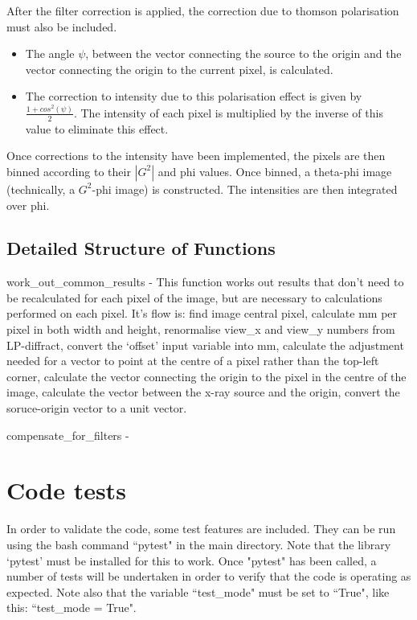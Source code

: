 \documentclass{report}
\begin{document}
After the filter correction is applied, the correction due to thomson polarisation must also be included. 

\begin{itemize}
\item The angle $\psi$, between the vector connecting the source to the origin and the vector connecting the origin to the current pixel, is calculated. 
\item The correction to intensity due to this polarisation effect is given by $\frac{1 + cos^2(\psi)}{2}$. The intensity of each pixel is multiplied by the inverse of this value to eliminate this effect.
\end{itemize}

Once corrections to the intensity have been implemented, the pixels are then binned according to their $|G^2|$ and phi values. Once binned, a theta-phi image (technically, a $G^2$-phi image) is constructed. The intensities are then integrated over phi.

\section{Detailed Structure of Functions}

work\_out\_common\_results - This function works out results that don't need to be recalculated for each pixel of the image, but are necessary to calculations performed on each pixel. It's flow is: find image central pixel, calculate mm per pixel in both width and height, renormalise view\_x and view\_y numbers from LP-diffract, convert the `offset' input variable into mm, calculate the adjustment needed for a vector to point at the centre of a pixel rather than the top-left corner, calculate the vector connecting the origin to the pixel in the centre of the image, calculate the vector between the x-ray source and the origin, convert the soruce-origin vector to a unit vector.

compensate\_for\_filters - 

\chapter{Code tests}

In order to validate the code, some test features are included. They can be run using the bash command ``pytest" in the main directory. Note that the library `pytest' must be installed for this to work. Once "pytest" has been called, a number of tests will be undertaken in order to verify that the code is operating as expected. Note also that the variable ``test\_mode" must be set to ``True",
like this: ``test\_mode = True".
\end{document}
